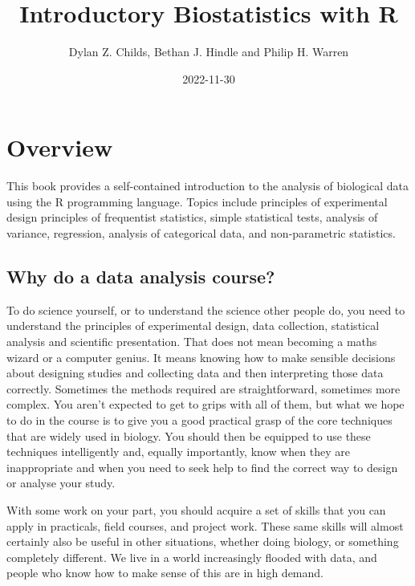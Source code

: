 \documentclass[
]{book}
\title{Introductory Biostatistics with R}
\author{Dylan Z. Childs, Bethan J. Hindle and Philip H. Warren}
\date{2022-11-30}
\begin{document}
\maketitle

{
\setcounter{tocdepth}{1}
\tableofcontents
}
\hypertarget{overview}{%
\chapter*{Overview}\label{overview}}

This book provides a self-contained introduction to the analysis of biological data using the R programming language. Topics include principles of experimental design principles of frequentist statistics, simple statistical tests, analysis of variance, regression, analysis of categorical data, and non-parametric statistics.

\hypertarget{why-do-a-data-analysis-course}{%
\section*{Why do a data analysis course?}\label{why-do-a-data-analysis-course}}

To do science yourself, or to understand the science other people do, you need to understand the principles of experimental design, data collection, statistical analysis and scientific presentation. That does not mean becoming a maths wizard or a computer genius. It means knowing how to make sensible decisions about designing studies and collecting data and then interpreting those data correctly. Sometimes the methods required are straightforward, sometimes more complex. You aren't expected to get to grips with all of them, but what we hope to do in the course is to give you a good practical grasp of the core techniques that are widely used in biology. You should then be equipped to use these techniques intelligently and, equally importantly, know when they are inappropriate and when you need to seek help to find the correct way to design or analyse your study.

With some work on your part, you should acquire a set of skills that you can apply in practicals, field courses, and project work. These same skills will almost certainly also be useful in other situations, whether doing biology, or something completely different. We live in a world increasingly flooded with data, and people who know how to make sense of this are in high demand.
\end{document}
